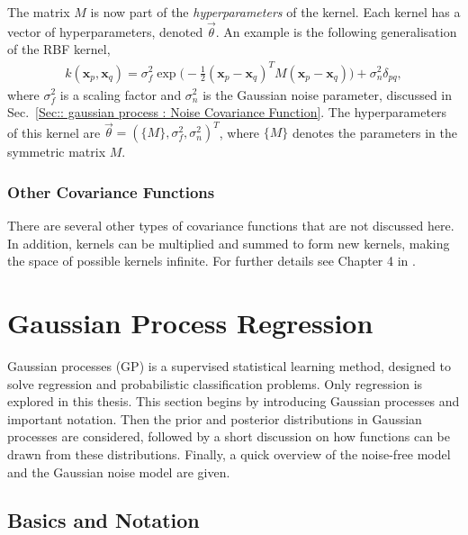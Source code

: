 \documentclass[twoside,english]{uiofysmaster}
\begin{document}
{{The matrix $M$ is now part of the \textit{hyperparameters} of the kernel. Each kernel has a vector of hyperparameters, denoted $\vec{\theta}$. An example is the following generalisation of the RBF kernel, 
\begin{align}
k(\textbf{x}_p, \textbf{x}_q) = \sigma_f^2 \exp \big(- \frac{1}{2} (\textbf{x}_p - \textbf{x}_q)^T M (\textbf{x}_p - \textbf{x}_q) \big) + \sigma_n^2 \delta_{pq},
\end{align}
where $\sigma_f^2$ is a scaling factor and $\sigma_n^2$ is the Gaussian noise parameter, discussed in Sec.~\ref{Sec:: gaussian process : Noise Covariance Function}. The hyperparameters of this kernel are $\vec{\theta} = (\{M\}, \sigma^2_f, \sigma_n^2)^T$, where $\{M\}$ denotes the parameters in the symmetric matrix $M$. 

\subsubsection{Other Covariance Functions}

There are several other types of covariance functions that are not discussed here. In addition, kernels can be multiplied and summed to form new kernels, making the space of possible kernels infinite. For further details see Chapter 4 in \cite{rasmussen2006gaussian}.




\section{Gaussian Process Regression}\label{Sec: gaussian process : Gaussian Process Regression}

Gaussian processes (GP) is a supervised statistical learning method, designed to solve regression and probabilistic classification problems. Only regression is explored in this thesis. This section begins by introducing Gaussian processes and important notation. Then the prior and posterior distributions in Gaussian processes are considered, followed by a short discussion on how functions can be drawn from these distributions. Finally, a quick overview of the noise-free model and the Gaussian noise model are given.

\subsection{Basics and Notation}\label{Sec:: gaussian process : Basics and Notation}

}}
\end{document}
